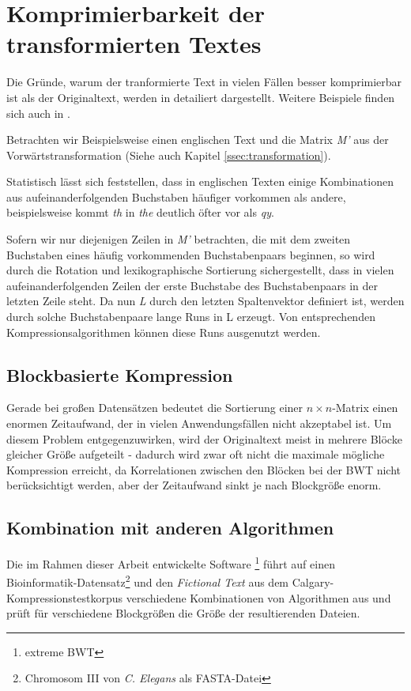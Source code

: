 \documentclass[ngerman,pdftex,paper=A4,DIV=calc,titlepage,12pt]{scrartcl}
\newtheorem[L]{boxedDefinition}{Definition}
\begin{document}
\section{Komprimierbarkeit der transformierten Textes}
Die Gründe, warum der tranformierte Text in vielen Fällen besser komprimierbar ist als der Originaltext, werden in \cite{burrows1994block} detailiert dargestellt. Weitere Beispiele finden sich auch in \cite{Wik2012-1}.

Betrachten wir Beispielsweise einen englischen Text und die Matrix \textit{M'} aus der Vorwärtstransformation (Siehe auch Kapitel \vref{ssec:transformation}).

Statistisch lässt sich feststellen, dass in englischen Texten einige Kombinationen aus aufeinanderfolgenden Buchstaben häufiger vorkommen als andere, beispielsweise kommt \textit{th} in \textit{the} deutlich öfter vor als \textit{qy}.

Sofern wir nur diejenigen Zeilen in \textit{M'} betrachten, die mit dem zweiten Buchstaben eines häufig vorkommenden Buchstabenpaars beginnen, so wird durch die Rotation und lexikographische Sortierung sichergestellt, dass    in vielen aufeinanderfolgenden Zeilen der erste Buchstabe des Buchstabenpaars in der letzten Zeile steht. Da nun \textit{L} durch den letzten Spaltenvektor definiert ist, werden durch solche Buchstabenpaare lange Runs in L erzeugt. Von entsprechenden Kompressionsalgorithmen können diese Runs ausgenutzt werden.

\subsection{Blockbasierte Kompression}
Gerade bei großen Datensätzen bedeutet die Sortierung einer $n \times n$-Matrix einen enormen Zeitaufwand, der in vielen Anwendungsfällen nicht akzeptabel ist. Um diesem Problem entgegenzuwirken, wird der Originaltext meist in mehrere Blöcke gleicher Größe aufgeteilt - dadurch wird zwar oft nicht die maximale mögliche Kompression erreicht, da Korrelationen zwischen den Blöcken bei der BWT nicht berücksichtigt werden, aber der Zeitaufwand sinkt je nach Blockgröße enorm.

\subsection{Kombination mit anderen Algorithmen}
Die im Rahmen dieser Arbeit entwickelte Software \footnote{extreme BWT} führt auf einen Bioinformatik-Datensatz\footnote{Chromosom III von \textit{C. Elegans} als FASTA-Datei} und den \textit{Fictional Text} aus dem Calgary-Kompressionstestkorpus verschiedene Kombinationen von Algorithmen aus und prüft für verschiedene Blockgrößen die Größe der resultierenden Dateien.
\end{document}

